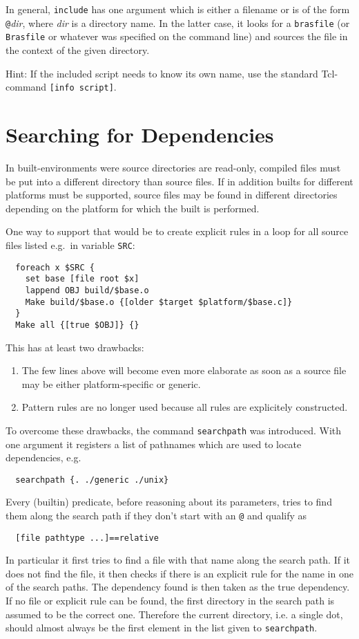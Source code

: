 \documentclass[11pt]{scrartcl}
\makeatletter
\newcommand{\brasfile}{\texttt{brasfile}}
\newcommand{\Brasfile}{\texttt{Brasfile}}
\newcommand{\Indextt}[1]{\texttt{#1}\index{#1@\texttt{#1}}}
\makeatother
\begin{document}
In general, \texttt{include} has one argument which is either a
filename or is of the form \texttt{@}\textit{dir}, where \textit{dir}
is a directory name. In the latter case, it looks for a \brasfile{} (or
\Brasfile{} or whatever was specified on the command line) and sources
the file in the context of the given directory.

Hint: If the included script needs to know its own name, use the
standard Tcl-command \texttt{[info script]}.
\section{Searching for Dependencies}
\label{sec:searchpath}

In built-environments were source directories are read-only, compiled
files must be put into a different directory than source files. If in
addition builts for different platforms must
be supported, source files may be found in different directories
depending on the platform for which the built is performed.

One way to support that would be to create explicit rules in a loop
for all source files listed e.g.\ in variable \texttt{SRC}:
\begin{verbatim}
  foreach x $SRC {
    set base [file root $x]
    lappend OBJ build/$base.o
    Make build/$base.o {[older $target $platform/$base.c]}
  }
  Make all {[true $OBJ]} {}
\end{verbatim}

This has at least two drawbacks:
\begin{enumerate}
\item The few lines above will become even more elaborate as soon as a
  source file may be either platform-specific or generic.
\item Pattern rules are no longer used because all rules are
  explicitely constructed.
\end{enumerate}

To overcome these drawbacks, the command \Indextt{searchpath} was
introduced. With one argument it registers a list of pathnames which are
used to locate dependencies, e.g.
\begin{verbatim}
  searchpath {. ./generic ./unix}
\end{verbatim}
Every (builtin) predicate, before reasoning about its parameters,
tries to find them along the search path if they don't start with an
\texttt{@} and qualify as
\begin{verbatim}
  [file pathtype ...]==relative
\end{verbatim}
In particular it first tries to find a file with that name along the
search path. If it does not find the file, it then checks if there is
an explicit rule for the name in one of the search paths. The
dependency found is then taken as the true dependency. If no file or
explicit rule can be found, the first directory in the search path is
assumed to be the correct one. Therefore the current directory, i.e. a
single dot, should almost always be the first element in the list
given to \texttt{searchpath}.
\end{document}
